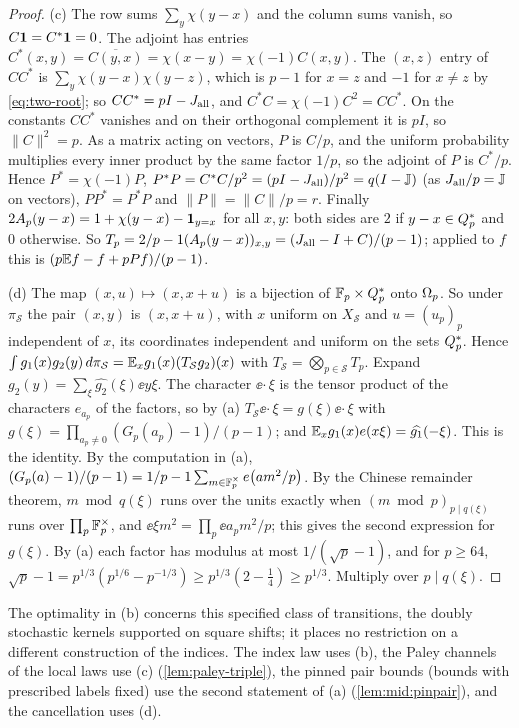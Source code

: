 \begin{proof}
(c) The row sums $\sum_y\chi(y-x)$ and the column sums vanish, so
$C\mathbf 1=C^*\mathbf 1=0$. The adjoint has entries
$C^*(x,y)=\overline{C(y,x)}=\chi(x-y)=\chi(-1)C(x,y)$. The $(x,z)$ entry of $CC^*$
is $\sum_y\chi(y-x)\chi(y-z)$, which is $p-1$ for $x=z$ and $-1$ for $x\ne z$ by
\eqref{eq:two-root}; so $CC^*=pI-J_{\mathrm{all}}$, and $C^*C=\chi(-1)C^2=CC^*$. On the
constants $CC^*$ vanishes and on their orthogonal complement it is $pI$, so
$\|C\|^2=p$. As a matrix acting on vectors, $P$ is $C/p$, and the uniform
probability multiplies every inner product by the same factor $1/p$, so the
adjoint of $P$ is $C^*/p$. Hence $P^*=\chi(-1)P$,
$P^*P=C^*C/p^2=(pI-J_{\mathrm{all}})/p^2=q(I-\mathbb J)$ (as $J_{\mathrm{all}}/p=\mathbb J$ on vectors),
$PP^*=P^*P$ and $\|P\|=\|C\|/p=r$. Finally
$2A_{p}(y-x)=1+\chi(y-x)-\mathbf 1_{y=x}$ for all $x,y$: both sides are $2$ if
$y-x\in Q_{p}^{*}$ and $0$ otherwise. So
$T_p=2/p-1(A_{p}(y-x))_{x,y}=(J_{\mathrm{all}}-I+C)/(p-1)$; applied to $f$ this is
$(p\mathbb E f-f+pPf)/(p-1)$.

(d) The map $(x,u)\mapsto(x,x+u)$ is a bijection of $\mathbb F_p\times Q_{p}^{*}$ onto $\Omega_{p}$.
So under $\pi_{\mathcal S}$ the pair $(x,y)$ is $(x,x+u)$, with $x$ uniform on
$X_{\mathcal S}$ and $u=(u_p)_p$ independent of $x$, its coordinates independent
and uniform on the sets $Q_{p}^{*}$. Hence
$\int g_1(x)g_2(y)\,d\pi_{\mathcal S}=\mathbb E_xg_1(x)(T_{\mathcal S}g_2)(x)$ with
$T_{\mathcal S}=\bigotimes_{p\in\mathcal S}T_p$. Expand
$g_2(y)=\sum_\xi\widehat{g_2}(\xi)\ee{y\xi}$. The character $\ee{\cdot\,\xi}$ is
the tensor product of the characters $e_{a_p}$ of the factors, so by (a)
$T_{\mathcal S}\ee{\cdot\,\xi}=g(\xi)\ee{\cdot\,\xi}$ with
$g(\xi)=\prod_{a_p\ne0}(G_p(a_p)-1)/(p-1)$; and
$\mathbb E_xg_1(x)e\!\left(x\xi\right)=\widehat{g_1}(-\xi)$. This is the identity. By the
computation in (a), $(G_p(a)-1)/(p-1)=1/p-1\sum_{m\in\mathbb F_p^\times}e\!\left(am^2/p\right)$.
By the Chinese remainder theorem, $m\bmod q(\xi)$ runs over the units exactly
when $(m\bmod p)_{p\mid q(\xi)}$ runs over $\prod_p\mathbb F_p^\times$, and
$\ee{\xi m^2}=\prod_p\ee{a_pm^2/p}$; this gives the second expression for
$g(\xi)$. By (a) each factor has modulus at most $1/(\sqrt p-1)$, and for
$p\ge64$, $\sqrt p-1=p^{1/3}(p^{1/6}-p^{-1/3})\ge p^{1/3}(2-\tfrac14)\ge p^{1/3}$.
Multiply over $p\mid q(\xi)$.
\end{proof}

The optimality in (b) concerns this specified class of transitions, the
doubly stochastic kernels supported on square shifts; it places no
restriction on a different construction of the indices. The index law uses
(b), the Paley channels of the local laws use (c) (\cref{lem:paley-triple}),
the pinned pair bounds (bounds with prescribed labels fixed) use
the second statement of (a) (\cref{lem:mid:pinpair}), and the
cancellation uses (d).

